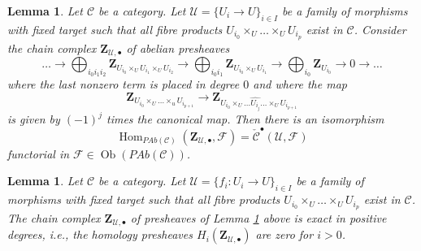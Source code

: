 \documentclass[10pt,a4paper]{amsart}
\theoremstyle{plain}
\newtheorem{lemma}[subsection]{Lemma}
\theoremstyle{definition}
\theoremstyle{remark}
\numberwithin{equation}{subsection}
\def\Hom{\mathop{\mathrm{Hom}}\nolimits}
\def\Ob{\mathop{\mathrm{Ob}}\nolimits}
\begin{document}
\begin{lemma}
\label{lemma-cech-map-into}
Let $\mathcal{C}$ be a category. Let $\mathcal{U} = \{U_i \to U\}_{i \in I}$
be a family of morphisms with fixed target such that all fibre products
$U_{i_0} \times_U \ldots \times_U U_{i_p}$ exist in $\mathcal{C}$.
Consider the chain complex $\mathbf{Z}_{\mathcal{U}, \bullet}$
of abelian presheaves
$$
\ldots
\to
\bigoplus_{i_0i_1i_2} \mathbf{Z}_{U_{i_0} \times_U U_{i_1} \times_U U_{i_2}}
\to
\bigoplus_{i_0i_1} \mathbf{Z}_{U_{i_0} \times_U U_{i_1}}
\to
\bigoplus_{i_0} \mathbf{Z}_{U_{i_0}}
\to 0 \to \ldots
$$
where the last nonzero term is placed in degree $0$
and where the map
$$
\mathbf{Z}_{U_{i_0} \times_U \ldots \times_u U_{i_{p + 1}}}
\longrightarrow
\mathbf{Z}_{U_{i_0} \times_U
\ldots \widehat{U_{i_j}} \ldots \times_U U_{i_{p + 1}}}
$$
is given by $(-1)^j$ times the canonical map.
Then there is an isomorphism
$$
\Hom_{\textit{PAb}(\mathcal{C})}(\mathbf{Z}_{\mathcal{U}, \bullet}, \mathcal{F})
=
\check{\mathcal{C}}^\bullet(\mathcal{U}, \mathcal{F})
$$
functorial in $\mathcal{F} \in \Ob(\textit{PAb}(\mathcal{C}))$.
\end{lemma}

\begin{lemma}
\label{lemma-homology-complex}
Let $\mathcal{C}$ be a category. Let
$\mathcal{U} = \{f_i : U_i \to U\}_{i \in I}$ be a family of morphisms
with fixed target such that all fibre products
$U_{i_0} \times_U \ldots \times_U U_{i_p}$ exist in $\mathcal{C}$.
The chain complex $\mathbf{Z}_{\mathcal{U}, \bullet}$ of presheaves
of Lemma \ref{lemma-cech-map-into} above is exact in positive
degrees, i.e., the homology presheaves
$H_i(\mathbf{Z}_{\mathcal{U}, \bullet})$ are zero for $i > 0$.
\end{lemma}
\end{document}
